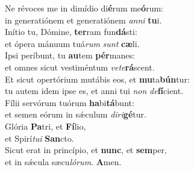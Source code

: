 \oddverse Ne révoces me in dimídio di\textbf{é}rum me\textbf{ó}rum:~\*\\
\oddverse in generatiónem et generatiónem \textit{an}\textit{ni} \textbf{tu}i.\\
\evenverse Inítio tu, Dómine, \textbf{ter}ram fun\textbf{dá}sti:~\*\\
\evenverse et ópera mánuum tuá\textit{rum} \textit{sunt} \textbf{cæ}li.\\
\oddverse Ipsi períbunt, tu \textbf{au}tem \textbf{pér}manes:~\*\\
\oddverse et omnes sicut vestiméntum \textit{ve}\textit{te}\textbf{rá}scent.\\
\evenverse Et sicut opertórium mutábis eos, et \textbf{mu}ta\textbf{bún}tur:~\*\\
\evenverse tu autem idem ipse es, et anni tui \textit{non} \textit{de}\textbf{fí}cient.\\
\oddverse Fílii servórum tuórum \textbf{ha}bi\textbf{tá}bunt:~\*\\
\oddverse et semen eórum in sǽculum \textit{di}\textit{ri}\textbf{gé}tur.\\
\evenverse Glória \textbf{Pa}tri, et \textbf{Fí}lio,~\*\\
\evenverse et Spirí\textit{tu}\textit{i} \textbf{San}cto.\\
\oddverse Sicut erat in princípio, et \textbf{nunc}, et \textbf{sem}per,~\*\\
\oddverse et in sǽcula sæcu\textit{ló}\textit{rum}. \textbf{A}men.\\
